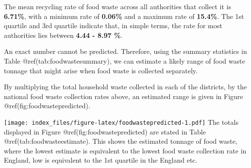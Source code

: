 \documentclass[
]{article}
\begin{document}
The mean recycling rate of food waste across all authorities that
collect it is \textbf{6.71\%}, with a minimum rate of \textbf{0.06\%}
and a maximum rate of \textbf{15.4\%}. The 1st quartile and 3rd quartile
indicate that, in simple terms, the rate for most authorities lies
between \textbf{4.44 - 8.97 \%}.

An exact number cannot be predicted. Therefore, using the summary
statistics in Table @ref(tab:foodwastesummary), we can estimate a likely
range of food waste tonnage that might arise when food waste is
collected separately.

By multiplying the total household waste collected in each of the
districts, by the national food waste collection rates above, an
estimated range is given in Figure @ref(fig:foodwastepredicted).

\texttt{[image: index\_files/figure-latex/foodwastepredicted-1.pdf]} The
totals displayed in Figure @ref(fig:foodwastepredicted) are stated in
Table @ref(tab:foodwasteestimate). This shows the estimated tonnage of
food waste, where the lowest estimate is equivalent to the lowest food
waste collection rate in England, low is equivalent to the 1st quartile
in the England etc.

\providecommand{\docline}[3]{\noalign{\global\setlength{\arrayrulewidth}{#1}}\arrayrulecolor[HTML]{#2}\cline{#3}}

\setlength{\tabcolsep}{0pt}

\renewcommand*{\arraystretch}{1.5}
\end{document}
